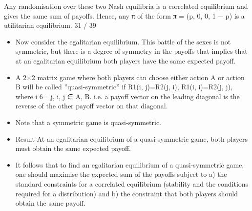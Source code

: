 \documentclass[]{report}
\begin{document}
Any randomisation over these two Nash equilibria is a correlated
equilibrium and gives the same sum of payoffs.
Hence, any π of the form π = (p, 0, 0, 1 − p) is a utilitarian
equilibrium.
31 / 39

\begin{itemize}
	\item Now consider the egalitarian equilibrium. This battle of the sexes
	is not symmetric, but there is a degree of symmetry in the payoffs
	that implies that at an egalitarian equilibrium both players have
	the same expected payoff.
	\item	A 2×2 matrix game where both players can choose either action A
	or action B will be called ”quasi-symmetric” if
	R1(i, j)=R2(j, i),
	R1(i, i)=R2(j, j), where i 6= j, i, j ∈ {A, B}.
	i.e. a payoff vector on the leading diagonal is the reverse of the
	other payoff vector on that diagonal.
		\item Note that a symmetric game
	is quasi-symmetric.
\end{itemize}


\begin{itemize}
	\item Result At an egalitarian equilibrium of a quasi-symmetric game,
	both players must obtain the same expected payoff.
\item It follows that to find an egalitarian equilibrium of a
	quasi-symmetric game, one should maximise the expected sum of
	the payoffs subject to a) the standard constraints for a correlated
	equilibrium (stability and the conditions required for a distribution)
	and b) the constraint that both players should obtain the same
	payoff.
\end{itemize}
\end{document}
